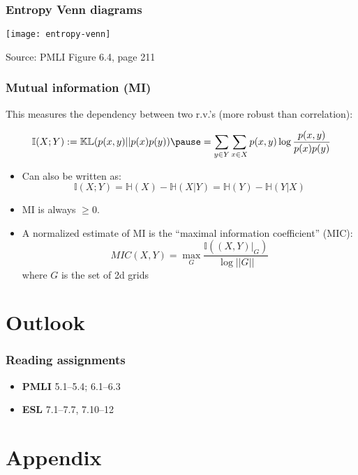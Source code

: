 \documentclass[smaller]{beamer}
\newcommand{\?}{\stackrel{?}{=}}
\newcommand{\fr}{\frac}
\newcommand{\mb}{\mathbb}
\begin{document}
\begin{frame}
  \frametitle{Entropy Venn diagrams}
  \pause

  \begin{center}
    \texttt{[image: entropy-venn]}

    {\scriptsize Source: PMLI Figure 6.4, page 211}
  \end{center}
\end{frame}

\begin{frame}
  \frametitle{Mutual information (MI)} 
  \pause
  This measures the dependency between two r.v.'s (more robust than correlation): \pause

  \begin{equation}
    \mb{I}(X;Y) := \mb{KL}(p(x,y)||p(x)p(y)) \pause = \sum_{y\in Y}\sum_{x\in X}p(x,y)\log\fr{p(x,y)}{p(x) p(y)}
  \end{equation}

  \pause

  \begin{alertblock}{}
    \begin{itemize}
    \item Can also be written as:
      \pause
      \begin{equation}
        \mb{I}(X;Y) = \mb{H}(X) - \mb{H}(X|Y) = \mb{H}(Y) - \mb{H}(Y|X)
      \end{equation}
      \pause

    \item MI is always $\ge 0$.
      \pause
    \item A normalized estimate of MI is the ``maximal information coefficient'' (MIC):\pause
      \begin{equation}
        MIC(X,Y) = \max_{G}\fr{\mb{I}((X,Y)|_{G})}{\log||G||}
      \end{equation}
      where $G$ is the set of 2d grids
    \end{itemize}
  \end{alertblock}
\end{frame}

\section{Outlook}

\begin{frame}
  \frametitle{Reading assignments}

  \begin{itemize}
  \item \textbf{PMLI} 5.1--5.4; 6.1--6.3
  \item \textbf{ESL} 7.1--7.7, 7.10--12

  \end{itemize}
\end{frame}

 
\appendix\addtocounter{part}{-1}

 
\section{Appendix}
 
\end{document}

